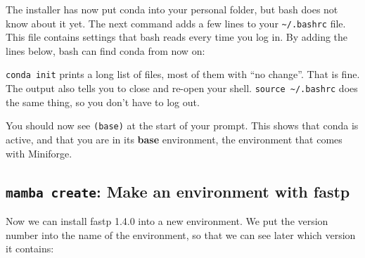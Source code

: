 \documentclass[
  letterpaper,
  DIV=11,
  numbers=noendperiod]{scrreprt}
\newenvironment{Shaded}{}{}
\newcommand{\AttributeTok}[1]{\textcolor[rgb]{0.84,0.23,0.29}{#1}}
\newcommand{\BuiltInTok}[1]{\textcolor[rgb]{0.84,0.23,0.29}{#1}}
\newcommand{\CommentTok}[1]{\textcolor[rgb]{0.42,0.45,0.49}{#1}}
\newcommand{\ExtensionTok}[1]{\textcolor[rgb]{0.84,0.23,0.29}{\textbf{#1}}}
\newcommand{\FunctionTok}[1]{\textcolor[rgb]{0.44,0.26,0.76}{#1}}
\newcommand{\NormalTok}[1]{\textcolor[rgb]{0.14,0.16,0.18}{#1}}
\newcommand{\VariableTok}[1]{\textcolor[rgb]{0.89,0.38,0.04}{#1}}
\begin{document}
The installer has now put conda into your personal folder, but bash does
not know about it yet. The next command adds a few lines to your
\texttt{\textasciitilde{}/.bashrc} file. This file contains settings
that bash reads every time you log in. By adding the lines below, bash
can find conda from now on:

\begin{Shaded}
\end{Shaded}

\texttt{conda\ init} prints a long list of files, most of them with ``no
change''. That is fine. The output also tells you to close and re-open
your shell. \texttt{source\ \textasciitilde{}/.bashrc} does the same
thing, so you don't have to log out.

You should now see \texttt{(base)} at the start of your prompt. This
shows that conda is active, and that you are in its \textbf{base}
environment, the environment that comes with Miniforge.

\subsection{\texorpdfstring{\texttt{mamba\ create}: Make an environment
with
fastp}{mamba create: Make an environment with fastp}}\label{mamba-create-make-an-environment-with-fastp}

Now we can install fastp 1.4.0 into a new environment. We put the
version number into the name of the environment, so that we can see
later which version it contains:
\end{document}
